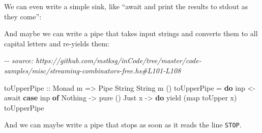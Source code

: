 \documentclass[]{article}
\newenvironment{Shaded}{}{}
\newcommand{\CommentTok}[1]{\textcolor[rgb]{0.38,0.63,0.69}{\textit{#1}}}
\newcommand{\DataTypeTok}[1]{\textcolor[rgb]{0.56,0.13,0.00}{#1}}
\newcommand{\FunctionTok}[1]{\textcolor[rgb]{0.02,0.16,0.49}{#1}}
\newcommand{\KeywordTok}[1]{\textcolor[rgb]{0.00,0.44,0.13}{\textbf{#1}}}
\newcommand{\NormalTok}[1]{#1}
\newcommand{\OperatorTok}[1]{\textcolor[rgb]{0.40,0.40,0.40}{#1}}
\newcommand{\OtherTok}[1]{\textcolor[rgb]{0.00,0.44,0.13}{#1}}
\begin{document}
We can even write a simple sink, like ``await and print the results to stdout as
they come'':

\begin{Shaded}
\end{Shaded}

And maybe we can write a pipe that takes input strings and converts them to all
capital letters and re-yields them:

\begin{Shaded}
\begin{Highlighting}[]
\CommentTok{{-}{-} source: https://github.com/mstksg/inCode/tree/master/code{-}samples/misc/streaming{-}combinators{-}free.hs\#L101{-}L108}

\OtherTok{toUpperPipe ::} \DataTypeTok{Monad}\NormalTok{ m }\OtherTok{=\textgreater{}} \DataTypeTok{Pipe} \DataTypeTok{String} \DataTypeTok{String}\NormalTok{ m ()}
\NormalTok{toUpperPipe }\OtherTok{=} \KeywordTok{do}
\NormalTok{    inp }\OtherTok{\textless{}{-}}\NormalTok{ await}
    \KeywordTok{case}\NormalTok{ inp }\KeywordTok{of}
      \DataTypeTok{Nothing} \OtherTok{{-}\textgreater{}} \FunctionTok{pure}\NormalTok{ ()}
      \DataTypeTok{Just}\NormalTok{ x  }\OtherTok{{-}\textgreater{}} \KeywordTok{do}
\NormalTok{        yield (}\FunctionTok{map} \FunctionTok{toUpper}\NormalTok{ x)}
\NormalTok{        toUpperPipe}
\end{Highlighting}
\end{Shaded}

And we can maybe write a pipe that stops as soon as it reads the line
\texttt{STOP}.
\end{document}
